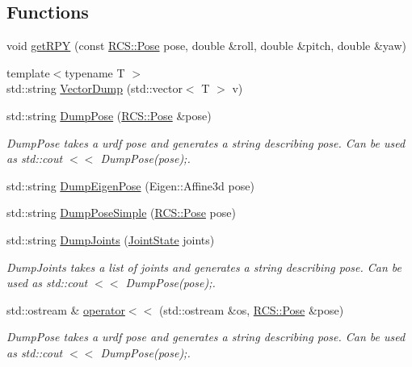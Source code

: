 \subsection*{Functions}
\begin{DoxyCompactItemize}
\item 
void \hyperlink{namespaceRCS_a6e911197b35a4857f179af61811d4b0a}{get\-R\-P\-Y} (const \hyperlink{namespaceRCS_aa07e45d8a50e30064283d2b38087f999}{R\-C\-S\-::\-Pose} pose, double \&roll, double \&pitch, double \&yaw)
\item 
{\footnotesize template$<$typename T $>$ }\\std\-::string \hyperlink{namespaceRCS_a1938bb64156e84a530fdfd58d5da45cd}{Vector\-Dump} (std\-::vector$<$ T $>$ v)
\item 
std\-::string \hyperlink{namespaceRCS_a35eaff1f2c8ec5520f595d6f3b2d38b3}{Dump\-Pose} (\hyperlink{namespaceRCS_aa07e45d8a50e30064283d2b38087f999}{R\-C\-S\-::\-Pose} \&pose)
\begin{DoxyCompactList}\small\item\em Dump\-Pose takes a urdf pose and generates a string describing pose. Can be used as std\-::cout $<$$<$ Dump\-Pose(pose);. \end{DoxyCompactList}\item 
std\-::string \hyperlink{namespaceRCS_a369d68374f2cf012c48cc0e4c3275762}{Dump\-Eigen\-Pose} (Eigen\-::\-Affine3d pose)
\item 
std\-::string \hyperlink{namespaceRCS_abaf9d2b5df201cc3bcaac13a362492f9}{Dump\-Pose\-Simple} (\hyperlink{namespaceRCS_aa07e45d8a50e30064283d2b38087f999}{R\-C\-S\-::\-Pose} pose)
\item 
std\-::string \hyperlink{namespaceRCS_ad467dfc15b94a5e025af3e094ac21860}{Dump\-Joints} (\hyperlink{RCS_8h_aa4adb93a26caa4dacba9c9614e283245}{Joint\-State} joints)
\begin{DoxyCompactList}\small\item\em Dump\-Joints takes a list of joints and generates a string describing pose. Can be used as std\-::cout $<$$<$ Dump\-Pose(pose);. \end{DoxyCompactList}\item 
std\-::ostream \& \hyperlink{namespaceRCS_af0cfadb4002d5ba5ec3ffdf2c96839e0}{operator$<$$<$} (std\-::ostream \&os, \hyperlink{namespaceRCS_aa07e45d8a50e30064283d2b38087f999}{R\-C\-S\-::\-Pose} \&pose)
\begin{DoxyCompactList}\small\item\em Dump\-Pose takes a urdf pose and generates a string describing pose. Can be used as std\-::cout $<$$<$ Dump\-Pose(pose);. \end{DoxyCompactList}\item 

\end{DoxyCompactItemize}
